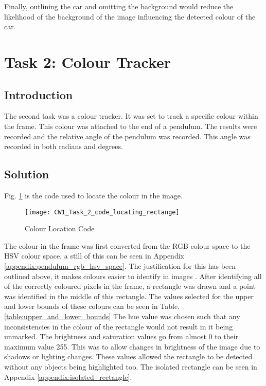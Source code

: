 \documentclass[conference]{IEEEtran}
\begin{document}
Finally, outlining the car and omitting the background would reduce the likelihood of the background of the image influencing the detected colour of the car.

\section{Task 2: Colour Tracker}

\subsection{Introduction}

The second task was a colour tracker. It was set to track a specific colour within the frame. This colour was attached to the end of a pendulum. The results were recorded and the relative angle of the pendulum was recorded. This angle was recorded in both radians and degrees. 

\subsection{Solution}
Fig. \ref{fig:CW1_Task_2_code_locating_rectange} is the code used to locate the colour in the image. 

\begin{figure}
\centerline{\texttt{[image: CW1\_Task\_2\_code\_locating\_rectange]}}
\caption{Colour Location Code}
\label{fig:CW1_Task_2_code_locating_rectange}
\end{figure}

The colour in the frame was first converted from the RGB colour space to the HSV colour space, a still of this can be seen in Appendix \ref{appendix:pendulum_rgb_hsv_space}. The justification for this has been outlined above, it makes colours easier to identify in images \cite{ref:HSV_vs_RGB}. After identifying all of the correctly coloured pixels in the frame, a rectangle was drawn and a point was identified in the middle of this rectangle. 
The values selected for the upper and lower bounds of these colours can be seen in Table. \ref{table:upper_and_lower_bounds} The hue value was chosen such that any inconsistencies in the colour of the rectangle would not result in it being unmarked. The brightness and saturation values go from almost 0 to their maximum value 255. This was to allow changes in brightness of the image due to shadows or lighting changes.  These values allowed the rectangle to be detected without any objects being highlighted too. The isolated rectangle can be seen in Appendix \ref{appendix:isolated_rectangle}.
\end{document}
